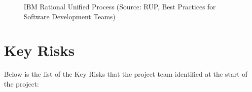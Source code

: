 \documentclass[12pt]{article} %
\begin{document}
		\begin{figure}[H] %
			\caption{IBM Rational Unified Process (Source: RUP, Best Practices for Software Development Teams)}
			\label{fig:speciation}
		\end{figure}
		
		
	
	
	
	
	
	
	
	

	
\section{Key Risks}

Below is the list of the Key Risks that the project team identified at the start of the project:\\
\end{document}
